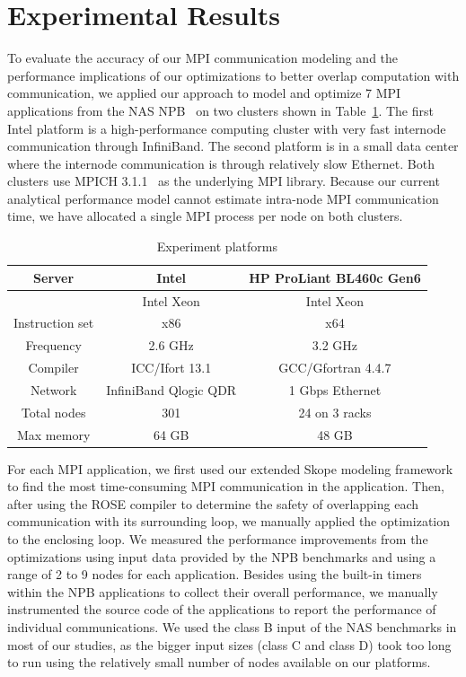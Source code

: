 \section{Experimental Results}
\label{sec-exp}

To evaluate the accuracy of our MPI communication modeling and
the performance implications of our optimizations to
better overlap computation with communication, we applied our approach
to model and optimize 7 MPI applications from the NAS NPB~\cite{npb}
on two clusters shown in Table~\ref{tab:hw}.  The first Intel
platform is a high-performance computing cluster with very fast
internode communication through InfiniBand.  The second platform is in
a small data center where the internode communication is through
relatively slow Ethernet.  Both clusters use MPICH 3.1.1~\cite{mpich2}
as the underlying MPI library.  Because our current analytical
performance model cannot estimate intra-node MPI communication time, we
have allocated a single MPI process per node on both clusters.

\begin{table}
\caption{Experiment platforms}
\begin{center}
\begin{tabular}{c|c c}
\hline
Server & Intel & HP ProLiant BL460c Gen6 \\
\hline
          &  Intel Xeon & Intel Xeon \\
Instruction set  &  x86 & x64 \\
Frequency &  2.6 GHz & 3.2 GHz \\
Compiler  &  ICC/Ifort 13.1 & GCC/Gfortran 4.4.7 \\
Network   &  InfiniBand Qlogic QDR & 1 Gbps Ethernet \\
Total nodes &  301 & 24 on 3 racks\\
Max memory &  64 GB & 48 GB \\
\hline
\hline
\end{tabular}
\end{center}
\label{tab:hw}
\end{table}

For each MPI application, we first used our extended Skope
modeling framework to find the most time-consuming MPI communication
in the application.  Then, after using the ROSE compiler to determine the safety of 
overlapping each communication with its surrounding loop, we manually applied the 
optimization to the enclosing loop.  We measured the
performance improvements from the optimizations using input data
provided by the NPB benchmarks and using a range of 2 to 9 nodes for
each application.  Besides using the built-in timers within the NPB
applications to collect their overall performance, we manually
instrumented the source code of the applications to report the
performance of individual communications. We used the class B input of the NAS
benchmarks in most of our studies, as the bigger input sizes (class C and class D) 
took too long to run using the relatively small number of nodes available on our platforms. 

